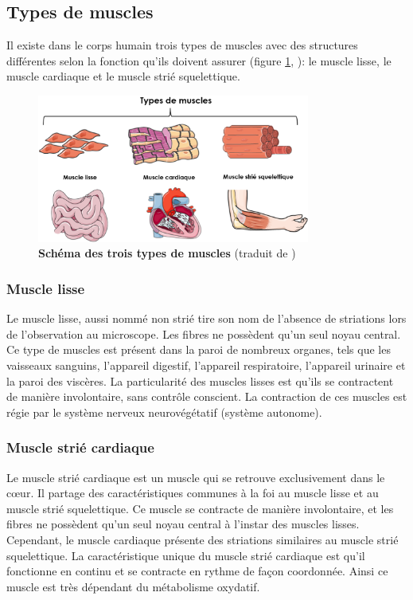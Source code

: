 \subsection{Types de muscles}
Il existe dans le corps humain trois types de muscles avec des structures différentes selon la fonction qu'ils doivent assurer (figure \ref{fig:muscle-type}, \cite{gomez_oca_physiological_2021}): le muscle lisse, le muscle cardiaque et le muscle strié squelettique.
\begin{figure}[!ht]
 \centering
 \includegraphics[width=0.8\textwidth]{figures/muscle_type.png}
 \caption[Schéma des trois types de muscles]{\textbf{Schéma des trois types de muscles} (traduit de \cite{gomez_oca_physiological_2021})}
 \label{fig:muscle-type}
\end{figure}
\subsubsection{Muscle lisse}
Le muscle lisse, aussi nommé non strié tire son nom de l'absence de striations lors de l'observation au microscope. Les fibres ne possèdent qu'un seul noyau central. Ce type de muscles est présent dans la paroi de nombreux organes, tels que les vaisseaux sanguins, l'appareil digestif, l'appareil respiratoire, l'appareil urinaire et la paroi des viscères. La particularité des muscles lisses est qu'ils se contractent de manière involontaire, sans contrôle conscient. La contraction de ces muscles est régie par le système nerveux neurovégétatif (système autonome).

\subsubsection{Muscle strié cardiaque}
Le muscle strié cardiaque est un muscle qui se retrouve exclusivement dans le cœur. Il partage des caractéristiques communes à la foi au muscle lisse et au muscle strié squelettique. Ce muscle se contracte de manière involontaire, et les fibres ne possèdent qu'un seul noyau central à l'instar des muscles lisses. Cependant, le muscle cardiaque présente des striations similaires au muscle strié squelettique. La caractéristique unique du muscle strié cardiaque est qu'il fonctionne en continu et se contracte en rythme de façon coordonnée. Ainsi ce muscle est très dépendant du métabolisme oxydatif.

